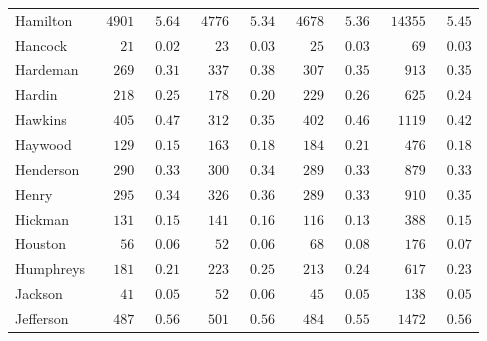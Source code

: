 \documentclass[9pt, oneside]{article}   	%
\begin{document}
\begin{longtable}{lcccccccc}
Hamilton  & $\phantom{0}4901$ & $\phantom{0}5.64$ & $\phantom{0}4776$ & $\phantom{0}5.34$ & $\phantom{0}4678$ & $\phantom{0}5.36$ & $\phantom{0}14355$ & $\phantom{0}5.45$ \\
Hancock  & $\phantom{000}21$ & $\phantom{0}0.02$ & $\phantom{000}23$ & $\phantom{0}0.03$ & $\phantom{000}25$ & $\phantom{0}0.03$ & $\phantom{0000}69$ & $\phantom{0}0.03$ \\
Hardeman  & $\phantom{00}269$ & $\phantom{0}0.31$ & $\phantom{00}337$ & $\phantom{0}0.38$ & $\phantom{00}307$ & $\phantom{0}0.35$ & $\phantom{000}913$ & $\phantom{0}0.35$ \\
Hardin  & $\phantom{00}218$ & $\phantom{0}0.25$ & $\phantom{00}178$ & $\phantom{0}0.20$ & $\phantom{00}229$ & $\phantom{0}0.26$ & $\phantom{000}625$ & $\phantom{0}0.24$ \\
Hawkins  & $\phantom{00}405$ & $\phantom{0}0.47$ & $\phantom{00}312$ & $\phantom{0}0.35$ & $\phantom{00}402$ & $\phantom{0}0.46$ & $\phantom{00}1119$ & $\phantom{0}0.42$ \\
Haywood  & $\phantom{00}129$ & $\phantom{0}0.15$ & $\phantom{00}163$ & $\phantom{0}0.18$ & $\phantom{00}184$ & $\phantom{0}0.21$ & $\phantom{000}476$ & $\phantom{0}0.18$ \\
Henderson  & $\phantom{00}290$ & $\phantom{0}0.33$ & $\phantom{00}300$ & $\phantom{0}0.34$ & $\phantom{00}289$ & $\phantom{0}0.33$ & $\phantom{000}879$ & $\phantom{0}0.33$ \\
Henry  & $\phantom{00}295$ & $\phantom{0}0.34$ & $\phantom{00}326$ & $\phantom{0}0.36$ & $\phantom{00}289$ & $\phantom{0}0.33$ & $\phantom{000}910$ & $\phantom{0}0.35$ \\
Hickman  & $\phantom{00}131$ & $\phantom{0}0.15$ & $\phantom{00}141$ & $\phantom{0}0.16$ & $\phantom{00}116$ & $\phantom{0}0.13$ & $\phantom{000}388$ & $\phantom{0}0.15$ \\
Houston  & $\phantom{000}56$ & $\phantom{0}0.06$ & $\phantom{000}52$ & $\phantom{0}0.06$ & $\phantom{000}68$ & $\phantom{0}0.08$ & $\phantom{000}176$ & $\phantom{0}0.07$ \\
Humphreys  & $\phantom{00}181$ & $\phantom{0}0.21$ & $\phantom{00}223$ & $\phantom{0}0.25$ & $\phantom{00}213$ & $\phantom{0}0.24$ & $\phantom{000}617$ & $\phantom{0}0.23$ \\
Jackson  & $\phantom{000}41$ & $\phantom{0}0.05$ & $\phantom{000}52$ & $\phantom{0}0.06$ & $\phantom{000}45$ & $\phantom{0}0.05$ & $\phantom{000}138$ & $\phantom{0}0.05$ \\
Jefferson  & $\phantom{00}487$ & $\phantom{0}0.56$ & $\phantom{00}501$ & $\phantom{0}0.56$ & $\phantom{00}484$ & $\phantom{0}0.55$ & $\phantom{00}1472$ & $\phantom{0}0.56$ \\

\end{longtable}
\end{document}
